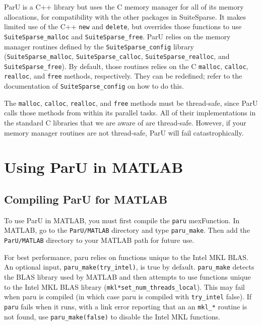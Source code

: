 \documentclass[12pt]{article}
\begin{document}
ParU is a C++ library but uses the C memory manager for all of its memory
allocations, for compatibility with the other packages in SuiteSparse.  It
makes limited use of the C++ \verb'new' and \verb'delete', but overrides those
functions to use \verb'SuiteSparse_malloc' and \verb'SuiteSparse_free'.  ParU
relies on the memory manager routines defined by the \verb'SuiteSparse_config'
library (\verb'SuiteSparse_malloc', \verb'SuiteSparse_calloc',
\verb'SuiteSparse_realloc', and \verb'SuiteSparse_free').  By default, those
routines relies on the C \verb'malloc', \verb'calloc', \verb'realloc', and
\verb'free' methods, respectively.  They can be redefined; refer to the
documentation of \verb'SuiteSparse_config' on how to do this.

The \verb'malloc', \verb'calloc', \verb'realloc', and \verb'free' methods must
be thread-safe, since ParU calls those methods from within its parallel tasks.
All of their implementations in the standard C libraries that we are aware of
are thread-safe.  However, if your memory manager routines are not thread-safe,
ParU will fail catastrophically.

\section{Using ParU in MATLAB}

\subsection{Compiling ParU for MATLAB}

To use ParU in MATLAB, you must first compile the \verb'paru' mexFunction.
In MATLAB, go to the \verb'ParU/MATLAB' directory and type \verb'paru_make'.
Then add the \verb'ParU/MATLAB' directory to your MATLAB path for future use.

For best performance, paru relies on functions unique to the Intel MKL BLAS.
An optional input, \verb'paru_make(try_intel)', is true by default.
\verb'paru_make' detects the BLAS library used by MATLAB and then attempts to
use functions unique to the Intel MKL BLAS library
(\verb'mkl*set_num_threads_local').  This may fail when paru is compiled (in
which case paru is compiled with \verb'try_intel' false).  If \verb'paru' fails
when it runs, with a link error reporting that an an \verb'mkl_*' routine is
not found, use \verb'paru_make(false)' to disable the Intel MKL functions.
\end{document}
